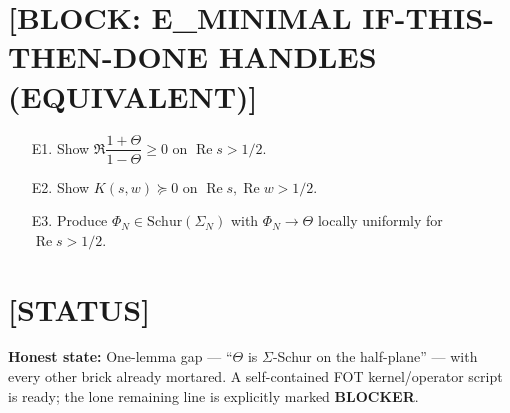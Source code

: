 \documentclass[11pt]{article}
\newcommand{\ReS}{\operatorname{Re}}
\newcommand{\Si}{\Sigma}
\newcommand{\SiN}{\Sigma_N}
\newcommand{\Th}{\Theta}
\begin{document}
\section*{[BLOCK: E\_MINIMAL IF-THIS-THEN-DONE HANDLES (EQUIVALENT)]}
\begin{itemize}
  \item[E1.] Show $\Re\dfrac{1+\Th}{1-\Th}\ge 0$ on $\ReS s>1/2$.
  \item[E2.] Show $K(s,w)\succeq 0$ on $\ReS s,\ReS w>1/2$.
  \item[E3.] Produce $\Phi_N\in\mathrm{Schur}(\SiN)$ with $\Phi_N\to\Th$ locally uniformly for $\ReS s>1/2$.
\end{itemize}

\section*{[STATUS]}
\textbf{Honest state:} One-lemma gap — “$\Th$ is $\Si$-Schur on the half-plane” — with every other brick already mortared. A self-contained FOT kernel/operator script is ready; the lone remaining line is explicitly marked \textbf{BLOCKER}.
\end{document}
